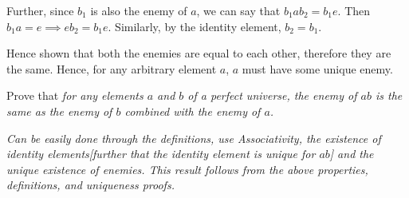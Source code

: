 \documentclass[a4paper]{exam}
\begin{document}
\begin{questions}
\begin{parts}
\begin{solution}
      Further, since $b_1$ is also the enemy of $a$, we can say that $ b_1 a b_2 = b_1 e $. Then $ b_1 a = e \implies e b_2 = b_1 e$. Similarly, by the identity element, $ b_2 = b_1 $. 

      Hence shown that both the enemies are equal to each other, therefore they are the same. Hence, for any arbitrary element $a$, $a$ must have some unique enemy.
    \end{solution}
  \item Prove that \textit{for any elements $a$ and $b$ of a perfect universe, the enemy of $ab$ is the same as the enemy of $b$ combined with the enemy of $a$.}
    \begin{solution}
      \textit{Can be easily done through the definitions, use Associativity, the existence of identity elements[further that the identity element is unique for $ab$] and the unique existence of enemies. This result follows from the above properties, definitions, and uniqueness proofs.}
    \end{solution}
  \end{parts}

\end{questions}
\end{document}
